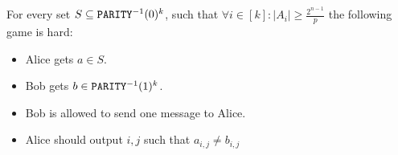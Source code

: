 \begin{lemma}
    For every set $S \subseteq \mathtt{PARITY}^{-1}(0)^k$, such that $\forall i \in [k]: |A_i| \geq
    \frac{2^{n - 1}}{p}$ the following game is hard: 
    
    \begin{itemize}
        \item Alice gets $a \in S$.
        
        \item Bob gets $b \in \mathtt{PARITY}^{-1}(1)^k$.
        
        \item Bob is allowed to send one message to Alice.
        
        \item Alice should output $i, j$ such that $a_{i, j} \neq b_{i, j}$
    \end{itemize}
    
    
\end{lemma}
